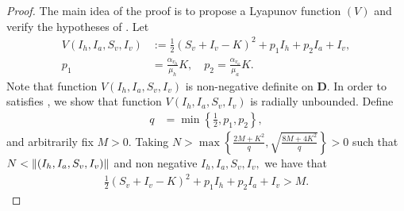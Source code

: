 \begin{proof}
	The main idea of the proof is to propose a Lyapunov function $(V)$ and verify 
	the hypotheses of  . Let 
	\begin{align*}
		V(I_{h},I_{a},S_{v},I_{v}) 
			&:=
			\frac{1}{2}\left( S_{v}+I_{v} - K \right)^{2}
			+p_{1}I_{h} + p_{2}I_{a} + I_{v},		\\
		p_{1} 
			&=
			\frac{\alpha_{v_{h}}}{\mu_{h}} K,		\quad
		p_{2}
			=
			\frac{\alpha_{v_{a}}}{\mu_{a}} K.
	\end{align*}
	Note that function $V(I_{h},I_{a},S_{v},I_{v})$ is non-negative 
	definite on $\mathbf{D}$. 
	In order to satisfies , we show that function 
	$V(I_{h},I_{a},S_{v},I_{v})$ is radially unbounded. 
	Define
	\begin{align*}
		q &= \min \left\lbrace \frac{1}{2},p_{1},p_{2} \right\rbrace,
	\end{align*}
	and arbitrarily fix $M>0$. Taking 
	$
		N > \max\left\lbrace \frac{2M+K^{2}}{q}, 
		\sqrt{\frac{8M+4K^{2}}{q}} \right\rbrace >0
	$
	 such that 
	$
		N < \lVert(I_{h},I_{a},S_{v},I_{v})\rVert
	$ and 
	non negative
	$
		I_{h},I_{a},S_{v},I_{v}, 
	$
	we have that
	\begin{align*}
		\frac{1}{2}
		\left(
			S_{v}+I_{v}-K 
		\right)^{2} 
		+ p_{1}I_{h} 
		+ p_{2}I_{a} 
		+ I_{v} > M.
	\end{align*}
	

\end{proof}
